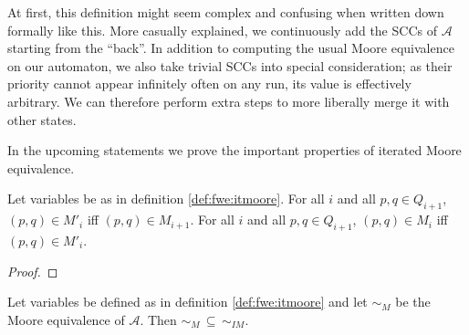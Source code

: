 At first, this definition might seem complex and confusing when written down formally like this. %
More casually explained, we continuously add the SCCs of $\mathcal{A}$ starting from the \enquote{back}. In addition to computing the usual Moore equivalence on our automaton, we also take trivial SCCs into special consideration; as their priority cannot appear infinitely often on any run, its value is effectively arbitrary. We can therefore perform extra steps to more liberally merge it with other states.

In the upcoming statements we prove the important properties of iterated Moore equivalence.

\begin{lem}
\label{lem:fwe:itm_mset_stays_same}
	Let variables be as in definition \ref{def:fwe:itmoore}. For all $i$ and all $p, q \in Q_{i+1}$, $(p, q) \in M'_i$ iff $(p, q) \in M_{i+1}$. For all $i$ and all $p, q \in Q_{i+1}$, $(p, q) \in M_i$ iff $(p, q) \in M'_i$.
\end{lem}

\begin{proof}
\end{proof}

\begin{theorem}
	Let variables be defined as in definition \ref{def:fwe:itmoore} and let $\sim_M$ be the Moore equivalence of $\mathcal{A}$. Then $\sim_M \,\subseteq\, \sim_{IM}$.
\end{theorem}

